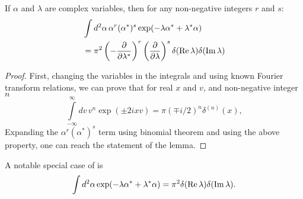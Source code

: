\begin{lemma}
\label{lmm:c-numbers:fourier-of-moments}
	If $\alpha$ and $\lambda$ are complex variables,
	then for any non-negative integers $r$ and $s$:
	\begin{equation}
	\begin{split}
		& \int d^2\alpha\, \alpha^r (\alpha^*)^s \exp(-\lambda \alpha^* + \lambda^* \alpha) \\
		& = \pi^2
			\left( -\frac{\partial}{\partial \lambda^*} \right)^r
			\left( \frac{\partial}{\partial \lambda} \right)^s
			\delta(\operatorname{Re} \lambda) \delta(\operatorname{Im} \lambda)
	\end{split}
	\end{equation}
\end{lemma}
\begin{proof}
First, changing the variables in the integrals and using known Fourier transform relations, we can prove that for real $x$ and $v$, and non-negative integer $n$
\begin{equation*}
	\int\limits_{-\infty}^{\infty} dv\, v^n \exp(\pm 2 i x v)
	= \pi (\mp i / 2)^n \delta^{(n)}(x),
\end{equation*}
Expanding the $\alpha^r (\alpha^*)^s$ term using binomial theorem and using the above property,
one can reach the statement of the lemma.
\end{proof}

A notable special case of  is
\begin{equation*}
	\int d^2\alpha \exp(-\lambda \alpha^* + \lambda^* \alpha)
	= \pi^2 \delta(\operatorname{Re} \lambda) \delta(\operatorname{Im} \lambda).
\end{equation*}

